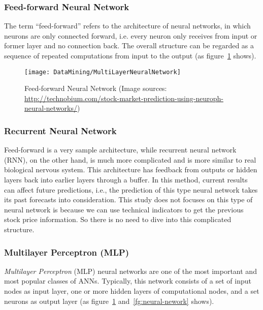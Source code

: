 \subsubsection{Feed-forward Neural Network}
The term ``feed-forward'' refers to the architecture of neural networks, in which neurons are only connected forward, i.e. every neuron only receives from input or former layer and no connection back\cite[p.~125]{heaton2008introduction}. The overall structure can be regarded as a sequence of repeated computations from input to the output (as figure~\ref{fg:FFNN} shows).
\begin{figure}[h]
	\centering
	\texttt{[image: DataMining/MultiLayerNeuralNetwork]}
	\caption{Feed-forward Neural Network (Image sources: \url{http://technobium.com/stock-market-prediction-using-neuroph-neural-networks/})}
	\label{fg:FFNN}
\end{figure}

\subsubsection{Recurrent Neural Network}
Feed-forward is a very sample architecture, while recurrent neural network (RNN), on the other hand, is much more complicated and is more similar to real biological nervous system. This architecture has feedback from outputs or hidden layers back into earlier layers through a buffer\cite[p.~91]{1_shadbolttaylor_2002}. In this method, current results can affect future predictions, i.e., the prediction of this type neural network takes its past forecasts into consideration. This study does not focuses on this type of neural network is because we can use technical indicators to get the previous stock price information. So there is no need to dive into this complicated structure.

\subsubsection{Multilayer Perceptron (MLP)}

\textit{Multilayer Perceptron} (MLP) neural networks are one of the most important and most popular classes of ANNs\cite[p.~213, Section~7.5]{4_kantardzic}. Typically, this network consists of a set of input nodes as input layer, one or more hidden layers of computational nodes, and a set neurons as output layer (as figure~\ref{fg:FFNN} and~\ref{fg:neural-nework} shows).\\

